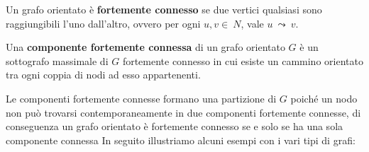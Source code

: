 
\begin{definition}
Un grafo orientato è \textbf{fortemente connesso} se due vertici qualsiasi sono raggiungibili l'uno dall'altro, ovvero per ogni $ u, v \in \: N $, vale $ u \: \leadsto \: v $.
\end{definition}

\begin{definition}
Una \textbf{componente fortemente connessa} di un grafo orientato $G$ è un sottografo massimale di $G$ fortemente connesso in cui esiste un cammino orientato tra ogni coppia di nodi ad esso appartenenti.
\end{definition}
Le componenti fortemente connesse formano una partizione di $G$ poiché un nodo non può trovarsi contemporaneamente in due componenti fortemente connesse, di conseguenza un grafo orientato è fortemente connesso se e solo se ha una sola componente connessa
In seguito illustriamo alcuni esempi con i vari tipi di grafi:\\\\
